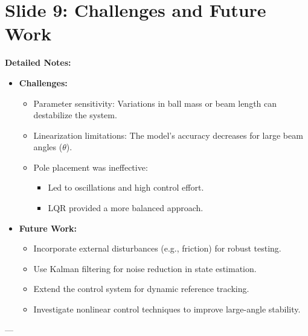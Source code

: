 \documentclass[12pt]{article}
\begin{document}
\section*{Slide 9: Challenges and Future Work}
\textbf{Detailed Notes:}
\begin{itemize}
    \item \textbf{Challenges:}
    \begin{itemize}
        \item Parameter sensitivity: Variations in ball mass or beam length can destabilize the system.
        \item Linearization limitations: The model’s accuracy decreases for large beam angles (\(\theta\)).
        \item Pole placement was ineffective:
        \begin{itemize}
            \item Led to oscillations and high control effort.
            \item LQR provided a more balanced approach.
        \end{itemize}
    \end{itemize}
    \item \textbf{Future Work:}
    \begin{itemize}
        \item Incorporate external disturbances (e.g., friction) for robust testing.
        \item Use Kalman filtering for noise reduction in state estimation.
        \item Extend the control system for dynamic reference tracking.
        \item Investigate nonlinear control techniques to improve large-angle stability.
    \end{itemize}
\end{itemize}

---
\end{document}
